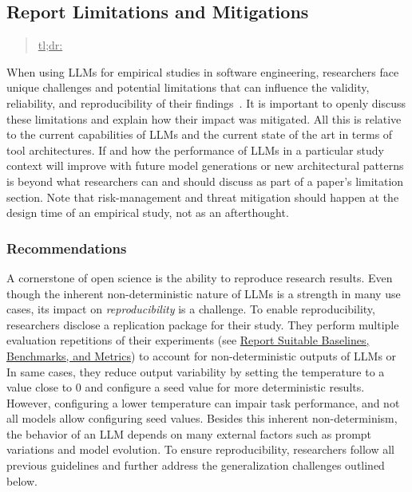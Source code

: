 



\subsection{Report Limitations and Mitigations}
\label{sec:report-limitations-and-mitigations}

\begin{quote}
\underline{tl;dr:} 
\end{quote}

When using LLMs for empirical studies in software engineering, researchers face unique challenges and potential limitations that can influence the validity, reliability, and reproducibility of their findings~\cite{sallou2024breaking}.
It is important to openly discuss these limitations and explain how their impact was mitigated.
All this is relative to the current capabilities of LLMs and the current state of the art in terms of tool architectures.
If and how the performance of LLMs in a particular study context will improve with future model generations or new architectural patterns is beyond what researchers can and should discuss as part of a paper's limitation section.
Note that risk-management and threat mitigation should happen at the design time of an empirical study, not as an afterthought.

\subsubsection{Recommendations}

A cornerstone of open science is the ability to reproduce research results.
Even though the inherent non-deterministic nature of LLMs is a strength in many use cases, its impact on \emph{reproducibility} is a challenge. To enable reproducibility, researchers \should disclose a replication package for their study.
They \should perform multiple evaluation repetitions of their experiments (see \href{/guidelines/report-baselines-benchmarks-and-metrics}{Report Suitable Baselines, Benchmarks, and Metrics}) to account for non-deterministic outputs of LLMs or
In same cases, they \may reduce output variability by setting the temperature to a value close to 0 and configure a seed value for more deterministic results.
However, configuring a lower temperature can impair task performance, and not all models allow configuring seed values.
Besides this inherent non-determinism, the behavior of an LLM depends on many external factors such as prompt variations and model evolution.
To ensure reproducibility, researchers \should follow all previous guidelines and further address the generalization challenges outlined below.

